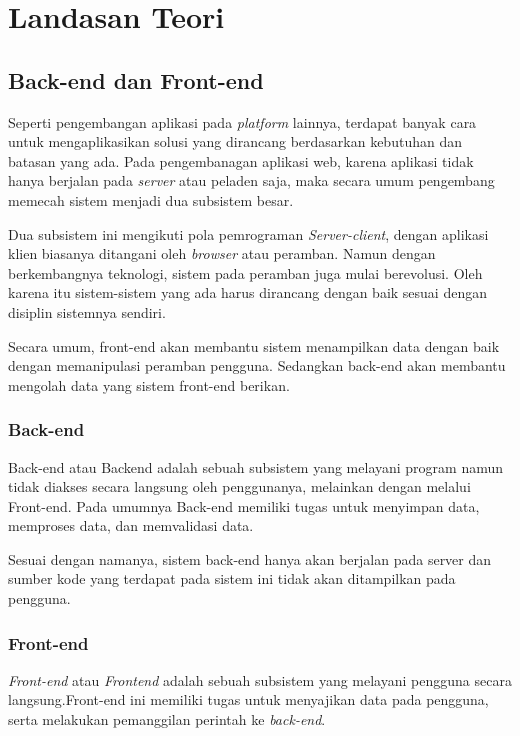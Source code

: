 \chapter{Landasan Teori}
\label{chap:teori}

\section{Back-end dan Front-end}
    Seperti pengembangan aplikasi pada \textit{platform} lainnya, terdapat
    banyak cara untuk mengaplikasikan solusi yang dirancang berdasarkan
    kebutuhan dan batasan yang ada. Pada pengembanagan aplikasi web, karena
    aplikasi tidak hanya berjalan pada \textit{server} atau peladen saja, maka
    secara umum pengembang memecah sistem menjadi dua subsistem besar.
    
    Dua subsistem ini mengikuti pola pemrograman \textit{Server-client}, dengan
    aplikasi klien biasanya ditangani oleh \textit{browser} atau peramban. Namun
    dengan berkembangnya teknologi, sistem pada peramban juga mulai berevolusi.
    Oleh karena itu sistem-sistem yang ada harus dirancang dengan baik sesuai
    dengan disiplin sistemnya sendiri.
    
    Secara umum, front-end akan membantu sistem menampilkan data dengan baik
    dengan memanipulasi peramban pengguna. Sedangkan back-end akan membantu
    mengolah data yang sistem front-end berikan.

\subsection{Back-end}
    Back-end atau Backend adalah sebuah subsistem yang melayani program namun
    tidak diakses secara langsung oleh penggunanya, melainkan dengan melalui
    Front-end\cite{oxford:definition-backend}. Pada umumnya Back-end memiliki
    tugas untuk menyimpan data, memproses data, dan memvalidasi data.
    
    Sesuai dengan namanya, sistem back-end hanya akan berjalan pada server dan
    sumber kode yang terdapat pada sistem ini tidak akan ditampilkan pada
    pengguna.

\subsection{Front-end}
    \textit{Front-end} atau \textit{Frontend} adalah sebuah subsistem yang
    melayani pengguna secara langsung\cite{oxford:definition-frontend}.Front-end
    ini memiliki tugas untuk menyajikan data pada pengguna, serta melakukan
    pemanggilan perintah ke \textit{back-end}.
    
